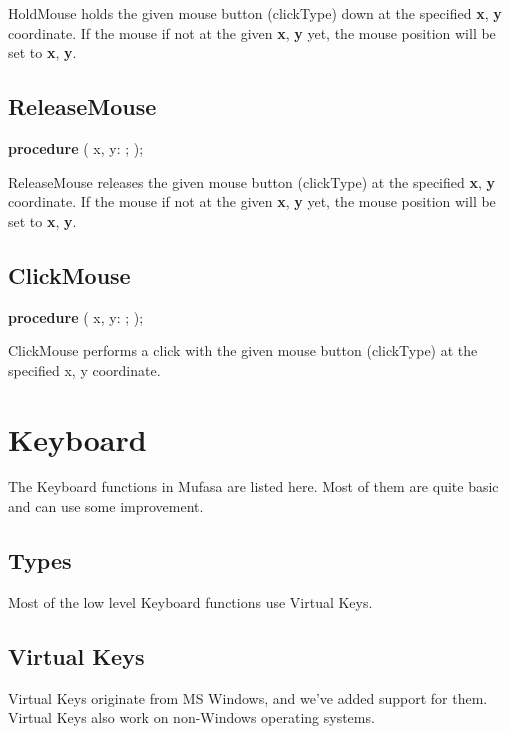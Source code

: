 \documentclass[a4paper]{report}
\begin{document}
HoldMouse holds the given mouse button (clickType) down at the specified \textbf{x}, \textbf{y} 
coordinate. If the mouse if not at the given \textbf{x}, \textbf{y} yet, the mouse position
will be set to \textbf{x}, \textbf{y}.

\subsection{ReleaseMouse}
\textbf{procedure} {\color{blue}{ReleaseMouse}}({\color{typeRed}
{x, y: }}{\color{typeGreen}{Integer}}; {\color{typeRed}{clickType :}}
{\color{typeGreen}{TClickType}});

ReleaseMouse releases the given mouse button (clickType) at the specified \textbf{x}, \textbf{y} 
coordinate. If the mouse if not at the given \textbf{x}, \textbf{y} yet, the mouse position
will be set to \textbf{x}, \textbf{y}.

\subsection{ClickMouse}
\textbf{procedure} {\color{blue}{ClickMouse}}({\color{typeRed}
{x, y: }}{\color{typeGreen}{Integer}}; {\color{typeRed}{clickType :}}
{\color{typeGreen}{TClickType}});

ClickMouse performs a click with the given mouse button (clickType) at the
specified x, y coordinate.

\section{Keyboard}

The Keyboard functions in Mufasa are listed here.
Most of them are quite basic and can use some improvement.

\subsection{Types}

Most of the low level Keyboard functions use Virtual Keys.

\subsection{Virtual Keys}

Virtual Keys originate from MS Windows, and we've added support for them.
Virtual Keys also work on non-Windows operating systems.
\end{document}
